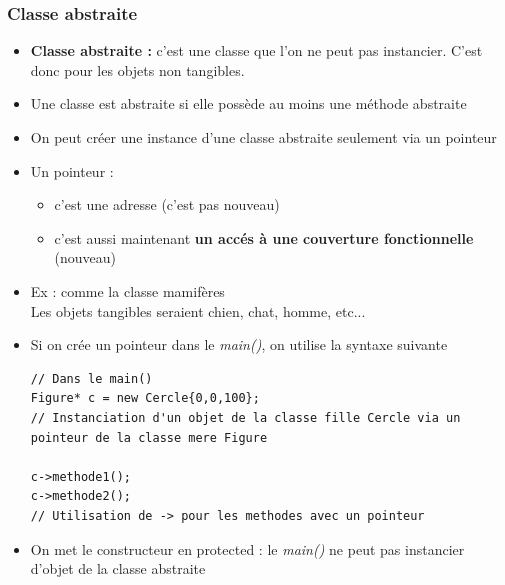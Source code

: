 \documentclass[12pt,a4paper]{article}
\begin{document}
\subsubsection{Classe abstraite}
\begin{itemize}
\item \textbf{Classe abstraite :} c'est une classe que l'on ne peut pas instancier. C'est donc pour les objets non tangibles.
\item Une classe est abstraite si elle possède au moins une méthode abstraite
\item On peut créer une instance d'une classe abstraite seulement via un pointeur
\item Un pointeur : 
\begin{itemize}
\item c'est une adresse (c'est pas nouveau)
\item c'est aussi maintenant \textbf{un accés à une couverture fonctionnelle} (nouveau)
\end{itemize}
\item Ex : comme la classe mamifères\\
Les objets tangibles seraient chien, chat, homme, etc...
\item Si on crée un pointeur dans le \textit{main()}, on utilise la syntaxe suivante
\begin{lstlisting}
// Dans le main()
Figure* c = new Cercle{0,0,100};
// Instanciation d'un objet de la classe fille Cercle via un pointeur de la classe mere Figure

c->methode1();
c->methode2();
// Utilisation de -> pour les methodes avec un pointeur
\end{lstlisting}
\item On met le constructeur en protected : le \textit{main()} ne peut pas instancier d'objet de la classe abstraite
\end{itemize}
\end{document}
